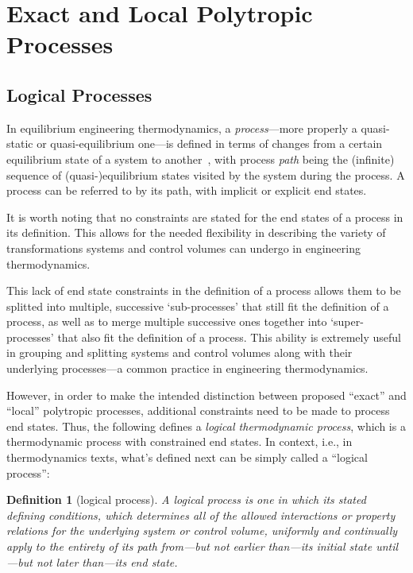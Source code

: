 \documentclass[fleqn,11pt]{SelfArx}
\newtheorem{definition}{Definition}
\begin{document}
\section{Exact and Local Polytropic Processes}\label{sec:exact.poly}

    \subsection{Logical Processes}\label{sec:logical}

    In equilibrium engineering thermodynamics, a \emph{process}---more properly  a  quasi-static
    or quasi-equilibrium one---is defined in terms of changes from a certain  equilibrium  state
    of a system to another~\cite{2013-CengelYA+BolesMA-AMGH}, with process \emph{path} being the
    (infinite) sequence of (quasi-)equilibrium states visited by the system during the  process.
    A process can be referred to by its path, with implicit or explicit end states.

    It is worth noting that no constraints are stated for the end states of  a  process  in  its
    definition.  This  allows  for  the  needed  flexibility  in  describing  the   variety   of
    transformations systems and control volumes can undergo in engineering thermodynamics.

    This lack of end state constraints in the definition of a process allows them to be splitted
    into multiple, successive `sub-processes' that still fit the definition  of  a  process,  as
    well as to merge multiple successive ones together into `super-processes' that also fit  the
    definition of a process. This ability is extremely useful in grouping and splitting  systems
    and control volumes along with their underlying processes---a common practice in engineering
    thermodynamics.

    However, in order to make the intended distinction between proposed ``exact'' and  ``local''
    polytropic processes, additional constraints need to be made to process  end  states.  Thus,
    the following defines a \emph{logical  thermodynamic  process},  which  is  a  thermodynamic
    process with constrained end states. In  context,  i.e.,  in  thermodynamics  texts,  what's
    defined next can be simply called a ``logical process'':

    \begin{definition}[logical process]\label{def:logical.proc}
        A logical process is one in which its stated defining conditions, which  determines  all
        of the allowed interactions or property relations for the underlying system  or  control
        volume, uniformly and continually apply to the  entirety  of  its  path  from---but  not
        earlier than---its initial state until---but not later than---its end state.
    \end{definition}
\end{document}
